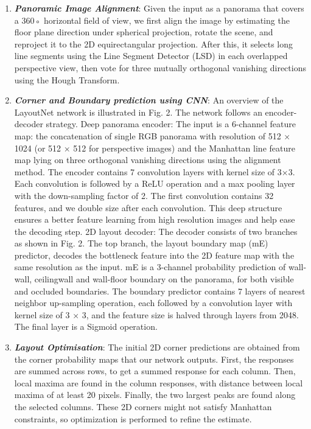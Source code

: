 \documentclass[11pt]{article}
\begin{document}
\begin{enumerate}
    \item {\em \textbf{Panoramic Image Alignment}}: Given the input as a panorama that covers a 360◦ horizontal
field of view, we first align the image by estimating
the floor plane direction under spherical projection, rotate
the scene, and reproject it to the 2D equirectangular
projection. After this, it selects
long line segments using the Line Segment Detector
(LSD) in each overlapped perspective view, then vote
for three mutually orthogonal vanishing directions using the
Hough Transform. 
    
    \item {\em \textbf{Corner and Boundary prediction using CNN}}: An overview of the LayoutNet network is illustrated in
Fig. 2. The network follows an encoder-decoder strategy.
Deep panorama encoder: The input is a 6-channel feature
map: the concatenation of single RGB panorama with
resolution of 512 × 1024 (or 512 × 512 for perspective images)
and the Manhattan line feature map lying on three orthogonal
vanishing directions using the alignment method. The encoder contains 7 convolution layers with
kernel size of 3×3. Each convolution is followed by a ReLU
operation and a max pooling layer with the down-sampling
factor of 2. The first convolution contains 32 features, and
we double size after each convolution. This deep structure
ensures a better feature learning from high resolution images
and help ease the decoding step.
2D layout decoder: The decoder consists of two branches
as shown in Fig. 2. The top branch, the layout boundary
map (mE) predictor, decodes the bottleneck feature into the
2D feature map with the same resolution as the input. mE
is a 3-channel probability prediction of wall-wall, ceilingwall
and wall-floor boundary on the panorama, for both visible
and occluded boundaries. The boundary predictor contains
7 layers of nearest neighbor up-sampling operation,
each followed by a convolution layer with kernel size of
3 × 3, and the feature size is halved through layers from
2048. The final layer is a Sigmoid operation.

    \item {\em \textbf{Layout Optimisation}}: The initial 2D corner predictions are obtained from the
corner probability maps that our network outputs. First, the
responses are summed across rows, to get a summed response
for each column. Then, local maxima are found in
the column responses, with distance between local maxima
of at least 20 pixels. Finally, the two largest peaks are found
along the selected columns. These 2D corners might not
satisfy Manhattan constraints, so optimization is performed
to refine the estimate.

\end{enumerate}
\end{document}
